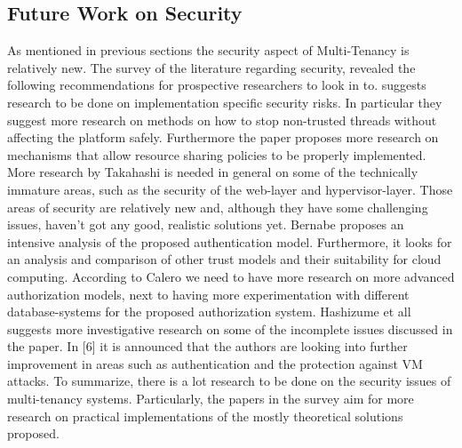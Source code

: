 \subsection{Future Work on Security}
As mentioned in previous sections the security aspect of Multi-Tenancy is relatively new. The survey of the literature regarding security, revealed the following recommendations for prospective researchers to look in to. \cite{Moreno2011Security} suggests research to be done on implementation specific security risks. In particular they suggest more research on methods on how to stop non-trusted threads without affecting the platform safely. Furthermore the paper proposes more research on mechanisms that allow resource sharing policies to be properly implemented. More research by Takahashi\cite{Takahashi2012Security} is needed in general on some of the technically immature areas, such as the security of the web-layer and hypervisor-layer. Those areas of security are relatively new and, although they have some challenging issues, haven't got any good, realistic solutions yet. Bernabe\cite{Bernabe2012Auth} proposes an intensive analysis of the proposed authentication model. Furthermore, it looks for an analysis and comparison of other trust models and their suitability for cloud computing. According to Calero \cite{Calero2010Auth} we need to have more research on more advanced authorization models, next to having more experimentation with different database-systems for the proposed authorization system. Hashizume et all\cite{Hashizume2013Security} suggests more investigative research on some of the incomplete issues discussed in the paper. In [6] it is announced that the authors are looking into further improvement in areas such as authentication and the protection against VM attacks. To summarize, there is a lot research to be done on the security issues of multi-tenancy systems. Particularly, the papers in the survey aim for more research on practical implementations of the mostly theoretical solutions proposed.
